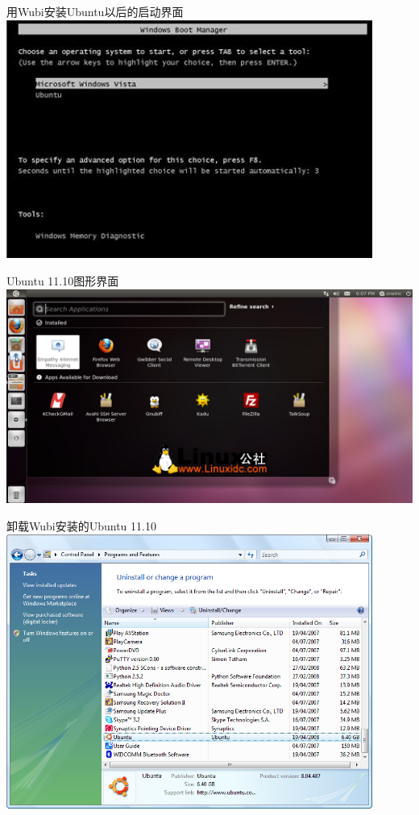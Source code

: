 \documentclass[xcolor=svgnames]{beamer}
\begin{document}
\begin{CJK*}{UTF8}{gbsn}
\begin{frame}{用Wubi安装Ubuntu以后的启动界面}
\includegraphics[width=0.9\textwidth]{boot-screen.jpg}
\end{frame}

\begin{frame}{Ubuntu 11.10图形界面}
\includegraphics[width=1.0\textwidth]{ubuntu-1110.jpg}
\end{frame}

\begin{frame}{卸载Wubi安装的Ubuntu 11.10}
\includegraphics[width=0.9\textwidth]{uninstall.png}
\end{frame}


\end{CJK*}
\end{document}
